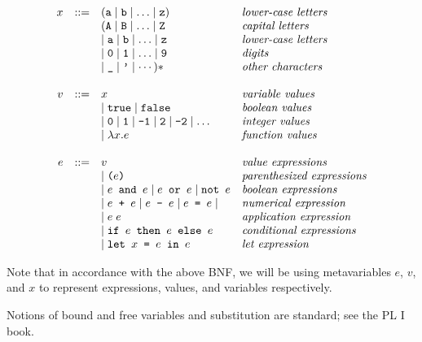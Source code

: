 $$
\begin{array}{rcll}
x &::=& (\Fbcode{a} \mid \Fbcode{b} \mid \ldots \mid \Fbcode{z}) &
    \textit{lower-case letters} \\
  &   & (\Fbcode{A} \mid \Fbcode{B} \mid \ldots \mid \Fbcode{Z} &
    \textit{capital letters} \\
  &   & \mid \Fbcode{a} \mid \Fbcode{b} \mid \ldots \mid \Fbcode{z} &
    \textit{lower-case letters} \\
  &   & \mid \Fbcode{0} \mid \Fbcode{1} \mid \ldots \mid \Fbcode{9} &
    \textit{digits} \\
  &   & \mid \Fbcode{\char'137} \mid \Fbcode{'} \mid \cdots)* &
    \textit{other characters} \\
&&&\\
v &::=& x & \textit{variable values}\\
  &   & \mid \Fbcode{true} \mid \Fbcode{false}  & \textit{boolean
  values}\\
  &   & \mid \Fbcode{0}\mid \Fbcode{1}\mid \Fbcode{-1}\mid \Fbcode{2}\mid
  \Fbcode{-2}\mid \ldots & \textit{integer values}\\
  &   & \mid \lambda x. e & \textit{function values}\\
&&&\\
e &::=& v & \textit{value expressions}\\
  &   & \mid \Fbcode{(}e\Fbcode{)} &
        \textit{parenthesized expressions}\\
  &   & \mid e \Fbcode{ and } e \mid e \Fbcode{ or } e \mid \Fbcode{not }
        e & \textit{boolean expressions}\\
  &   & \mid e \Fbcode{ + }e \mid e \Fbcode{ - }e \mid e \Fbcode{ = }e \mid & \textit{numerical
        expression}\\
  &   & \mid e\;e & \textit{application expression}\\
  &   & \mid \Fbcode{if }e\Fbcode{ then }e\Fbcode{ else }e &
        \textit{conditional expressions}\\
  &   & \mid \Fbcode{let } x \Fbcode{ = }e\Fbcode{ in }e & \textit{let expression}\\
\end{array}
$$

Note that in accordance with the above BNF, we will be using
metavariables $e$, $v$, and $x$ to represent expressions, values, and variables
respectively.

Notions of bound and free variables and substitution are standard; see the PL I book.


